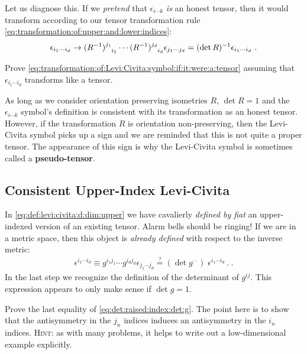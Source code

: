 \begin{subappendices}
Let us diagnose this. If we \emph{pretend} that $\epsilon_{i\cdots k}$ \emph{is} an honest tensor, then it would transform according to our tensor transformation rule \eqref{eq:transformation:of:upper:and:lower:indices}:
\begin{align}
    \epsilon_{i_1\cdots i_d} \to 
    (R\inv)\aij{j_1}{i_1}\cdots
    (R\inv)\aij{j_d}{i_d}
    \epsilon_{j_1 \cdots j_d} 
    =
    (\det R)\inv \epsilon_{i_1\cdots i_d}
    \label{eq:transformation:of:Levi:Civita:symbol:if:it:were:a:tensor}
    \ .
\end{align}
\begin{exercise}
Prove \eqref{eq:transformation:of:Levi:Civita:symbol:if:it:were:a:tensor} assuming that $\epsilon_{i_1\cdots i_d}$ transforms like a tensor.
\end{exercise}
As long as we consider orientation preserving isometries $R$, $\det R =1$ and the $\epsilon_{i \cdots k}$ symbol's definition is consistent with its transformation as an honest tensor. However, if the transformation $R$ is orientation non-preserving, then the Levi-Civita symbol picks up a sign and we are reminded that this is not quite a proper tensor. The appearance of this sign is why the Levi-Civita symbol is sometimes called a \textbf{pseudo-tensor}.

\subsection{Consistent Upper-Index Levi-Civita}
In \eqref{eq:def:levi:civita:d:dim:upper} we have cavalierly \emph{defined by fiat} an upper-indexed version of an existing tensor. Alarm bells should be ringing! If we are in a metric space, then this object is \emph{already defined} with respect to the inverse metric:
\begin{align}
    \epsilon^{i_1\cdots i_d}
    \equiv
    g^{i_1j_1}
    \cdots
    g^{i_dj_d}
    \epsilon_{j_1\cdots j_d}
    \stackrel{?}{=}
    (\det g^{\cdot\cdot}) \;
    \epsilon^{i_1\cdots i_d} \ .
    \label{eq:det:raised:index:det:g}
     \ .
\end{align}
In the last step we recognize the definition of the determinant of $g^{ij}$. This expression appears to only make sense if $\det g = 1$.
\begin{exercise}
Prove the last equality of \eqref{eq:det:raised:index:det:g}. The point here is to show that the antisymmetry in the $j_n$ indices induces an antisymmetry in the $i_n$ indices. \textsc{Hint}: as with many problems, it helps to write out a low-dimensional example explicitly.
\end{exercise}


\end{subappendices}

